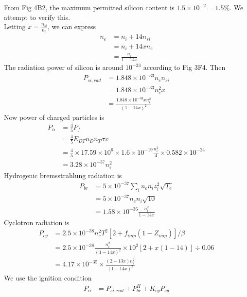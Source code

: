 \documentclass[answers]{exam}
\begin{document}
\begin{questions}
\begin{solution}
    From Fig 4B2, the maximum permitted silicon content is $1.5 \times 10^{-2} = 1.5\%$. We attempt to verify this. \\
    Letting $x = \frac{n_{si}}{n_e}$, we can express
    \begin{align*}
        n_e &= n_i + 14n_{si} \\
            &= n_i + 14xn_e \\
            &= \frac{n_i}{1-14x}
    \end{align*}
    The radiation power of silicon is around $10^{-33}$ according to Fig 3F4. Then
    \begin{align*}
        P_{si,rad} &= 1.848 \times 10^{-33} n_en_{si} \\
                   &= 1.848 \times 10^{-33} n_e^2x \\
                   &= \frac{1.848 \times 10^{-33}xn_i^2}{(1-14x)^2}
    \end{align*}
    Now power of charged particles is
    \begin{align*}
        P_\alpha &= \frac{4}{5} P_f \\
                 &= \frac{4}{5} E_{DT} n_Dn_T \overline{\sigma v} \\
                 &= \frac{4}{5} \times 17.59 \times 10^6 \times 1.6 \times 10^{-19} \frac{n_i^2}{4} \times 0.582 \times 10^{-24} \\
                 &= 3.28 \times 10^{-37} n_i^2
    \end{align*}
       Hydrogenic bremsstrahlung radiation is
    \begin{align*}
        P_{br} &= 5 \times 10^{-37} \sum_i n_en_iz_i^2 \sqrt{T_e} \\
               &= 5 \times 10^{-37} n_en_i \sqrt{10} \\
               &= 1.58 \times 10^{-36} \frac{n_i^2}{1-14x}
    \end{align*}
    Cyclotron radiation is
    \begin{align*}
        P_{cy} &= 2.5 \times 10^{-38} n_e^2 T^2 [2 + f_{imp}(1 - Z_{imp})]/\beta \\
               &= 2.5 \times 10^{-38} \frac{n_i^2}{(1-14x)^2} \times 10^2 [2 + x(1 - 14)] \div 0.06 \\
               &= 4.17 \times 10^{-35} \times \frac{(2 - 13x)n_i^2}{(1 - 14x)^2}
    \end{align*}
    We use the ignition condition
    \begin{align*}
        P_\alpha &= P_{si, rad} + P_{br}^H + K_{cy}P_{cy} \\

\end{align*}
\end{solution}
\end{questions}
\end{document}
